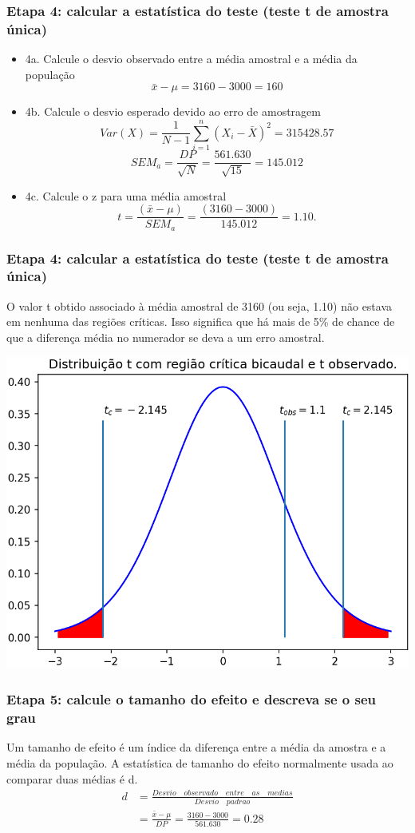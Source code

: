 \documentclass[11pt]{beamer}
\begin{document}
\begin{frame}
\frametitle{Etapa 4: calcular a estatística do teste (teste t de amostra única)}
\begin{itemize}
\item 4a. Calcule o desvio observado entre a média amostral e a média da população
\[\bar{x} - \mu = 3160-3000 = 160\]
\item 4b. Calcule o desvio esperado devido ao erro de amostragem
\[Var(X) = \frac{1}{N-1}\sum_{i=1}^n(X_i - \bar{X})^2 = 315428.57\]
\[SEM_a = \frac{DP}{\sqrt{N}} = \frac{561.630}{\sqrt{15}} = 145.012\]
\item 4c. Calcule o z para uma média amostral
\[t = \frac{(\bar{x} - \mu)}{SEM_a} = \frac{(3160-3000)}{145.012} = 1.10.\]
\end{itemize}
\end{frame}

\begin{frame}
\frametitle{Etapa 4: calcular a estatística do teste (teste t de amostra única)}
O valor t obtido associado à média amostral de 3160 (ou seja, 1.10) não estava em nenhuma das regiões críticas. Isso significa que há mais de 5\% de chance de que a diferença média no numerador se deva a um erro amostral.
\begin{center}\includegraphics[width=0.55\linewidth]{figs/regiao_critica_bicaudal_t_tobs} \end{center}

\end{frame}


\begin{frame}
\frametitle{Etapa 5: calcule o tamanho do efeito e descreva se o seu grau}
Um tamanho de efeito é um índice da diferença entre a média da amostra e a média da população. A estatística de tamanho do efeito normalmente usada ao comparar duas médias é d. 
\begin{align*}
d &= \frac{Desvio\quad observado\quad entre\quad as\quad medias}{Desvio\quad padrao}\\
  &= \frac{\bar{x}-\mu}{DP} = \frac{3160 - 3000}{561.630} = 0.28
\end{align*}

\end{frame}
\end{document}
